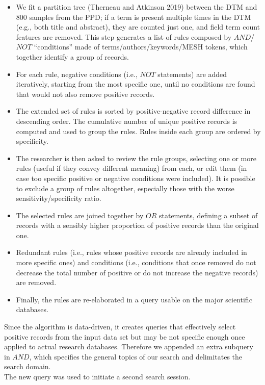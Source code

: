 \documentclass{article}
\begin{document}
\begin{itemize}
\tightlist
\item
  We fit a partition tree (Therneau and Atkinson 2019) between the DTM
  and 800 samples from the PPD; if a term is present multiple times in
  the DTM (e.g., both title and abstract), they are counted just one,
  and field term count features are removed. This step generates a list
  of rules composed by \(AND\)/\(NOT\) ``conditions'' made of
  terms/authors/keywords/MESH tokens, which together identify a group of
  records.
\item
  For each rule, negative conditions (i.e., \(NOT\) statements) are
  added iteratively, starting from the most specific one, until no
  conditions are found that would not also remove positive records.
\item
  The extended set of rules is sorted by positive-negative record
  difference in descending order. The cumulative number of unique
  positive records is computed and used to group the rules. Rules inside
  each group are ordered by specificity.
\item
  The researcher is then asked to review the rule groups, selecting one
  or more rules (useful if they convey different meaning) from each, or
  edit them (in case too specific positive or negative conditions were
  included). It is possible to exclude a group of rules altogether,
  especially those with the worse sensitivity/specificity ratio.
\item
  The selected rules are joined together by \(OR\) statements, defining
  a subset of records with a sensibly higher proportion of positive
  records than the original one.
\item
  Redundant rules (i.e., rules whose positive records are already
  included in more specific ones) and conditions (i.e., conditions that
  once removed do not decrease the total number of positive or do not
  increase the negative records) are removed.
\item
  Finally, the rules are re-elaborated in a query usable on the major
  scientific databases.
\end{itemize}

Since the algorithm is data-driven, it creates queries that effectively
select positive records from the input data set but may be not specific
enough once applied to actual research databases. Therefore we appended
an extra subquery in \(AND\), which specifies the general topics of our
search and delimitates the search domain.\\
The new query was used to initiate a second search session.
\end{document}
